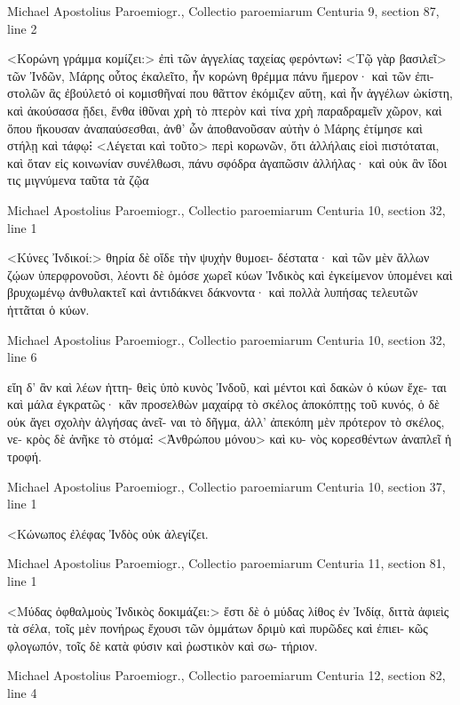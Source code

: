 \documentclass[12pt,letterpaper,twoside,final]{memoir}
\begin{document}
\begin{greek}
Michael Apostolius Paroemiogr., Collectio paroemiarum 
Centuria 9, section 87, line 2

<Κορώνη γράμμα κομίζει:> ἐπὶ τῶν ἀγγελίας ταχείας 
φερόντων⁝ <Τῷ γὰρ βασιλεῖ> τῶν Ἰνδῶν, Μάρης οὗτος 
ἐκαλεῖτο, ἦν κορώνη θρέμμα πάνυ ἥμερον· καὶ τῶν ἐπι-
στολῶν ἃς ἐβούλετό οἱ κομισθῆναί που θᾶττον ἐκόμιζεν 
αὕτη, καὶ ἦν ἀγγέλων ὠκίστη, καὶ ἀκούσασα ᾔδει, ἔνθα 
ἰθῦναι χρὴ τὸ πτερὸν καὶ τίνα χρὴ παραδραμεῖν χῶρον, 
καὶ ὅπου ἥκουσαν ἀναπαύσεσθαι, ἀνθ' ὧν ἀποθανοῦσαν 
αὐτὴν ὁ Μάρης ἐτίμησε καὶ στήλῃ καὶ τάφῳ⁝ <Λέγεται 
καὶ τοῦτο> περὶ κορωνῶν, ὅτι ἀλλήλαις εἰοὶ πιστόταται, 
καὶ ὅταν εἰς κοινωνίαν συνέλθωσι, πάνυ σφόδρα ἀγαπῶσιν 
ἀλλήλας· καὶ οὐκ ἂν ἴδοι τις μιγνύμενα ταῦτα τὰ ζῷα 




Michael Apostolius Paroemiogr., Collectio paroemiarum 
Centuria 10, section 32, line 1

<Κύνες Ἰνδικοί:> θηρία δὲ οἵδε τὴν ψυχὴν θυμοει-
δέστατα· καὶ τῶν μὲν ἄλλων ζῴων ὑπερφρονοῦσι, λέοντι 
δὲ ὁμόσε χωρεῖ κύων Ἰνδικὸς καὶ ἐγκείμενον ὑπομένει καὶ 
βρυχωμένῳ ἀνθυλακτεῖ καὶ ἀντιδάκνει δάκνοντα· καὶ πολλὰ 
λυπήσας τελευτῶν ἡττᾶται ὁ κύων. 



Michael Apostolius Paroemiogr., Collectio paroemiarum 
Centuria 10, section 32, line 6

                                       εἴη δ' ἂν καὶ λέων ἡττη-
θεὶς ὑπὸ κυνὸς Ἰνδοῦ, καὶ μέντοι καὶ δακὼν ὁ κύων ἔχε-
ται καὶ μάλα ἐγκρατῶς· κἂν προσελθὼν μαχαίρᾳ τὸ σκέλος 
ἀποκόπτῃς τοῦ κυνός, ὁ δὲ οὐκ ἄγει σχολὴν ἀλγήσας ἀνεῖ-
ναι τὸ δῆγμα, ἀλλ' ἀπεκόπη μὲν πρότερον τὸ σκέλος, νε-
κρὸς δὲ ἀνῆκε τὸ στόμα⁝ <Ἀνθρώπου μόνου> καὶ κυ-
νὸς κορεσθέντων ἀναπλεῖ ἡ τροφή. 



Michael Apostolius Paroemiogr., Collectio paroemiarum 
Centuria 10, section 37, line 1

<Κώνωπος ἐλέφας Ἰνδὸς οὐκ ἀλεγίζει. 



Michael Apostolius Paroemiogr., Collectio paroemiarum 
Centuria 11, section 81, line 1

<Μύδας ὀφθαλμοὺς Ἰνδικὸς δοκιμάζει:> ἔστι δὲ 
ὁ μύδας λίθος ἐν Ἰνδίᾳ, διττὰ ἀφιεὶς τὰ σέλα, τοῖς μὲν 
πονήρως ἔχουσι τῶν ὀμμάτων δριμὺ καὶ πυρῶδες καὶ ἐπιει-
κῶς φλογωπόν, τοῖς δὲ κατὰ φύσιν καὶ ῥωστικὸν καὶ σω-
τήριον. 



Michael Apostolius Paroemiogr., Collectio paroemiarum 
Centuria 12, section 82, line 4


\end{greek}
\end{document}
